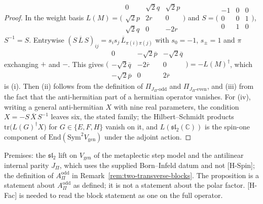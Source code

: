 \documentclass[11pt]{article}
\theoremstyle{definition}
\theoremstyle{remark}
\newcommand{\JPi}{J_{\Pi}}
\newcommand{\Aodd}{A_{\Pi}^{\mathrm{odd}}}
\newcommand{\Sym}{\mathrm{Sym}}
\begin{document}
    \begin{proof}
      In the weight basis
      $L(M) = \bigl(\begin{smallmatrix} 0 & \sqrt2 q & \sqrt2 p \\ \sqrt2 p & 2r & 0 \\ \sqrt2 q & 0 & -2r
      \end{smallmatrix}\bigr)$
      and $S = \bigl(\begin{smallmatrix} -1 & 0 & 0 \\ 0 & 0 & 1 \\ 0 & 1 & 0 \end{smallmatrix}\bigr)$, $S^{-1} = S$.
      Entrywise $(S\,\overline{L}\,S)_{ij} = s_{i}s_{j}\,\overline{L}_{\pi(i)\pi(j)}$ with $s_{0} = -1$, $s_{\pm} = 1$
      and $\pi$ exchanging $+$ and $-$.
      This gives $\bigl(\begin{smallmatrix} 0 & -\sqrt2\overline{p} & -\sqrt2\overline{q} \\ -\sqrt2\overline{q} &
      -2\overline{r} & 0
      \\ -\sqrt2\overline{p} & 0 & 2\overline{r} \end{smallmatrix}\bigr) = -L(M)^{\dagger}$, which is (i).
      Then (ii) follows from the definition of $\Pi_{\JPi\text{-odd}}$ and $\Pi_{\JPi\text{-even}}$, and (iii) from the
      fact that the anti-hermitian part of a hermitian operator vanishes.
      For (iv), writing a general anti-hermitian $X$ with nine real parameters, the condition
      $X = -S\,\overline{X}\,S^{-1}$ leaves six, the stated family; the Hilbert--Schmidt products
      $\mathrm{tr}\big(L(G)^{\dagger}X\big)$ for $G \in \{E, F, H\}$ vanish on it, and
      $L(\mathfrak{sl}_{2}(\mathbb{C}))$
      is the spin-one component of $\mathrm{End}(\Sym^{2} V_{\mathrm{gen}})$ under the adjoint action.
    \end{proof}

    Premises: the $\mathfrak{sl}_{2}$ lift on $V_{\mathrm{gen}}$ of the metaplectic step model and the antilinear
    internal
    parity $\JPi$, which uses the supplied Born--Infeld datum and not [H-Spin]; the definition of $\Aodd$ in
    Remark~\ref{rem:two-transverse-blocks}.
    The proposition is a statement about $\Aodd$ as defined; it is not a statement about the polar factor.
    [H-Fac] is needed to read the block statement as one on the full operator.
\end{document}
